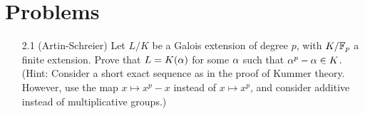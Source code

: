\section{Problems}
\begin{enumerate}
\item[2.1] (Artin-Schreier) Let $L/K$ be a Galois extension of degree $p$, with $K/\mathbb{F}_p$ a finite extension. Prove that $L=K(\alpha)$ for some $\alpha$ such that $\alpha^p-\alpha\in K$. (Hint: Consider a short exact sequence as in the proof of Kummer theory. However, use the map $x\mapsto x^p-x$ instead of $x\mapsto x^p$, and consider additive instead of multiplicative groups.)
\end{enumerate}
